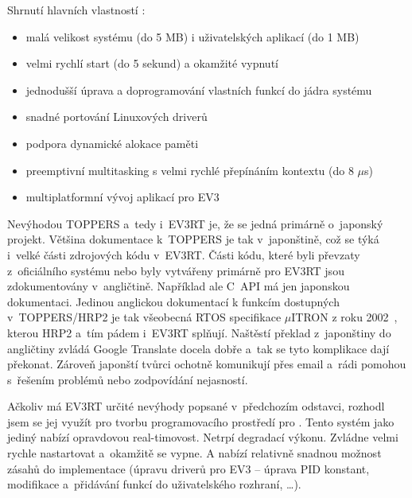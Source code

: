 Shrnutí hlavních vlastností \evRT:

\begin{itemize}
	\item malá velikost systému (do 5 MB) i uživatelských aplikací (do 1 MB)
	\item velmi rychlí start (do 5 sekund) a okamžité vypnutí
	\item jednodušší úprava a doprogramování vlastních funkcí do jádra systému
	\item snadné portování Linuxových driverů
	\item podpora dynamické alokace paměti
	\item preemptivní multitasking s velmi rychlé přepínáním kontextu (do 8 $\mu$s)
	\item multiplatformní vývoj aplikací pro EV3
\end{itemize}
 
Nevýhodou TOPPERS a~tedy i~EV3RT je, že se jedná primárně o~japonský projekt. 
Většina dokumentace k~TOPPERS je tak v~japonštině, což se týká i~velké části zdrojových kódu v~EV3RT. 
Části kódu, které byli převzaty z~oficiálního \lego{} systému nebo byly vytvářeny primárně pro EV3RT jsou zdokumentovány v~angličtině. 
Například ale C~API má jen japonskou dokumentaci.
Jedinou anglickou dokumentací k funkcím dostupných v~TOPPERS/HRP2 je tak všeobecná RTOS specifikace $\mu$ITRON z roku 2002~\cite{legoProgramingPlatform_TOPPERS-IRON}, kterou HRP2 a~tím pádem i~EV3RT splňují. %
Naštěstí překlad z~japonštiny do angličtiny zvládá Google Translate docela dobře a~tak se tyto komplikace dají překonat.
Zároveň japonští tvůrci ochotně komunikují přes email a~rádi pomohou s~řešením problémů nebo zodpovídání nejasností.

Ačkoliv má EV3RT určité nevýhody popsané v~předchozím odstavci, rozhodl jsem se jej využít pro tvorbu programovacího prostředí pro \legoEV{}.
Tento systém jako jediný nabízí opravdovou real-timovost.
Netrpí degradací výkonu.
Zvládne velmi rychle nastartovat a~okamžitě se vypne. 
A nabízí relativně snadnou možnost zásahů do implementace (úpravu driverů pro EV3 -- úprava PID konstant, modifikace a~přidávání funkcí do uživatelského rozhraní, \dots). 
